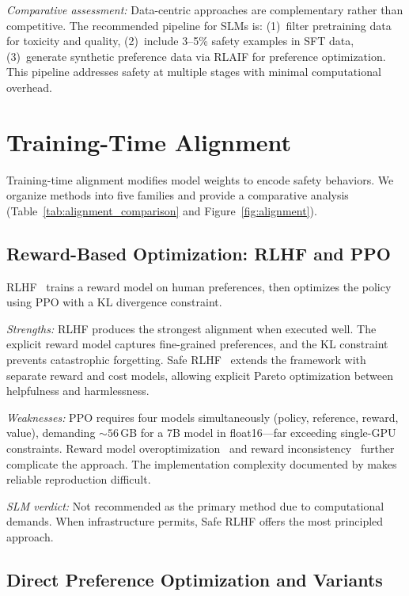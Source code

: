 \documentclass[12pt,a4paper]{article}
\begin{document}
\emph{Comparative assessment:} Data-centric approaches are complementary rather than competitive. The recommended pipeline for SLMs is: (1)~filter pretraining data for toxicity and quality, (2)~include 3--5\% safety examples in SFT data, (3)~generate synthetic preference data via RLAIF for preference optimization. This pipeline addresses safety at multiple stages with minimal computational overhead.

\section{Training-Time Alignment}\label{sec:alignment}

Training-time alignment modifies model weights to encode safety behaviors. We organize methods into five families and provide a comparative analysis (Table~\ref{tab:alignment_comparison} and Figure~\ref{fig:alignment}).

\subsection{Reward-Based Optimization: RLHF and PPO}

RLHF~\citep{ouyang2022training,stiennon2020learning,ziegler2019fine} trains a reward model on human preferences, then optimizes the policy using PPO with a KL divergence constraint.

\emph{Strengths:} RLHF produces the strongest alignment when executed well. The explicit reward model captures fine-grained preferences, and the KL constraint prevents catastrophic forgetting. Safe RLHF~\citep{dai2024safe} extends the framework with separate reward and cost models, allowing explicit Pareto optimization between helpfulness and harmlessness.

\emph{Weaknesses:} PPO requires four models simultaneously (policy, reference, reward, value), demanding ${\sim}56$\,GB for a 7B model in float16---far exceeding single-GPU constraints. Reward model overoptimization~\citep{gao2023scaling} and reward inconsistency~\citep{shen2024trickle} further complicate the approach. The implementation complexity documented by \citet{zheng2023secrets} makes reliable reproduction difficult.

\emph{SLM verdict:} Not recommended as the primary method due to computational demands. When infrastructure permits, Safe RLHF offers the most principled approach.

\subsection{Direct Preference Optimization and Variants}
\end{document}
